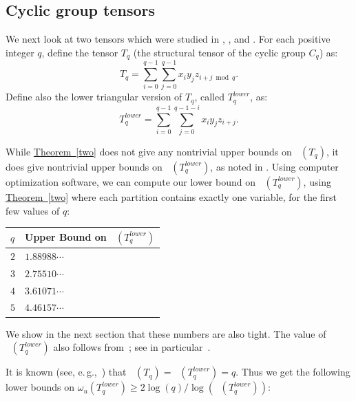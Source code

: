 \documentclass[11pt]{article}
\numberwithin{equation}{section}
\theoremstyle{definition}
\theoremstyle{plain}
\newcommand{\eg}{e.\,g.}
\newcommand{\expref}[2]{\hyperref[#2]{#1~\ref{#2}}}
\newcommand{\trr}{\mathop{\tilde{\operatorname{R}}}}
\newcommand{\tsr}{\mathop{\tilde{\operatorname{S}}}}
\theoremstyle{definition}
\begin{document}
%
\subsection{Cyclic group tensors}

We next look at two tensors which were studied in \cite{cohn2003group}, \cite{almanitcs}, and \cite[Section~7.3]{aw}. For each positive integer $q$, define the tensor $T_q$ (the structural tensor of the cyclic group $C_q$) as:
$$T_q=\sum_{i=0}^{q-1}\sum_{j=0}^{q-1} x_i y_j z_{i+j\bmod q}.$$
Define also the lower triangular version of $T_q$, called $T_q^{lower}$, as:
$$T_q^{lower}=\sum_{i=0}^{q-1}\sum_{j=0}^{q-1-i} x_i y_j z_{i+j}.$$

 While \expref{Theorem}{two} does not give any nontrivial upper bounds on $\tsr(T_q)$, it does give nontrivial upper bounds on $\tsr(T_q^{lower})$, as noted in \cite[Section~7.3]{aw}. Using computer optimization software, we can compute our lower bound on $\tsr(T_q^{lower})$, using \expref{Theorem}{two} where each partition contains exactly one variable, for the first few values of $q$:

\begin{center}
\begin{tabular}{l|l}
$q$ & Upper Bound on $\tsr(T_q^{lower})$ \\ \hline
$2$                                & $1.88988\cdots$                                                        \\
$3$                                & $2.75510\cdots$                                                        \\
$4$                                & $3.61071\cdots$                                                        \\
$5$                                & $4.46157\cdots$                                                     
\end{tabular}
\end{center}


We show in the next section that these numbers are also tight. The value of $\tsr(T_q^{lower})$ also follows from~\cite{strassen1991degeneration}; see in particular~\cite[{Table~1}]{strassen1991degeneration}.

It is known (see, \eg,~\cite{almanitcs}) that $\trr(T_q) = \trr(T_q^{lower}) = q$. Thus we get the following lower bounds on $\omega_u(T_q^{lower}) \geq 2 \log(q) / \log(\tsr(T_q^{lower}))$:
\end{document}
